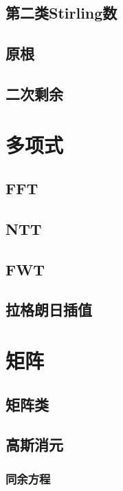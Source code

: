 ﻿\documentclass[a4paper,twocolumn]{article}
\begin{document}
\subsection{第二类Stirling数}

\subsection{原根}
\begin{spacing}{1.5}

\end{spacing}

\subsection{二次剩余}

\section{多项式}
\subsection{FFT}

\subsection{NTT}

\subsection{FWT}

\subsection{拉格朗日插值}

\section{矩阵}
\subsection{矩阵类}

\subsection{高斯消元}
\subsubsection{同余方程}

\end{document}
